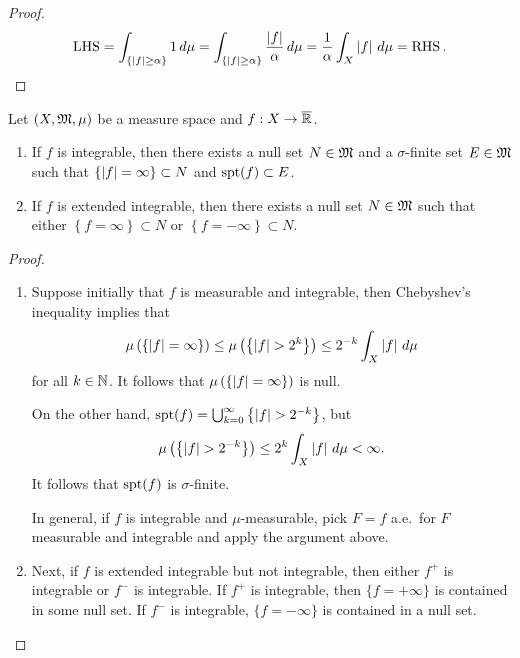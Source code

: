 \documentclass[a4paper]{article}
\renewcommand{\cupinfk}{\bigcup_{k=0}^\infty}
\begin{document}
\begin{proof}
  \[
    \begin{aligned}
      \operatorname{LHS} = \int_{\left\{ \left\lvert f\right\rvert \geq \alpha \right\}} 1 \, d \mu
      = \int_{\left\{ \left\lvert f\right\rvert \geq \alpha \right\}}
      \frac{\left\lvert f\right\rvert}{\alpha} \, d \mu
      = \frac{1}{\alpha} \int_X \left\lvert f\right\rvert \, d \mu
      = \operatorname{RHS}.
    \end{aligned}
  \]
\end{proof}

\begin{cor}
  Let $(X, \mathfrak{M}, \mu)$ be a measure space and $f: X \to \overline{\mathbb{R}}$.
  \begin{enumerate}
    \item If $f$ is integrable, then there exists a null set $N \in \mathfrak{M}$
          and a $\sigma$-finite set $E \in \mathfrak{M}$ such that $\left\{ \left\lvert f\right\rvert
          = \infty \right\} \subset N$ and $\operatorname{spt}(f) \subset E$.

    \item If $f$ is extended integrable, then there exists a null set $N
          \in \mathfrak{M}$ such that either $\left\{ f = \infty \right\} \subset
          N$ or $\left\{ f = -\infty \right\} \subset N$.
  \end{enumerate}
\end{cor}

\begin{proof}
  \begin{enumerate}
    \item Suppose initially that $f$ is measurable and integrable, then
          Chebyshev's inequality implies that
          \[
            \mu \left( \left\{ \left\lvert f\right\rvert = \infty \right\} \right)
            \leq \mu \left( \left\{ \left\lvert f\right\rvert > 2^k \right\} \right)
            \leq 2^{-k} \int_X \left\lvert f\right\rvert \, d \mu
          \]
          for all $k \in \mathbb{N}$. It follows that $\mu \left( \left\{ \left\lvert f\right\rvert
          = \infty \right\} \right)$ is null.

          On the other hand, $\spt(f) = \cupinfk \left\{ \abs{f} > 2^{-k}
          \right\}$, but
          \[
            \mu \left( \left\{ \left\lvert f\right\rvert > 2^{-k} \right\} \right)
            \leq 2^k \int_X \left\lvert f\right\rvert \, d \mu < \infty.
          \]
          It follows that $\operatorname{spt}(f)$ is $\sigma$-finite.

          In general, if $f$ is integrable and $\mu$-measurable, pick $F =
          f$ a.e.\ for $F$ measurable and integrable and apply the
          argument above.

    \item Next, if $f$ is extended integrable but not integrable, then
          either $f^+$ is integrable or $f^-$ is integrable. If $f^+$ is
          integrable, then $\{f = +\infty\}$ is contained in some null
          set. If $f^-$ is integrable, $\{f = -\infty\}$ is contained in a
          null set.
  \end{enumerate}
\end{proof}
\end{document}
